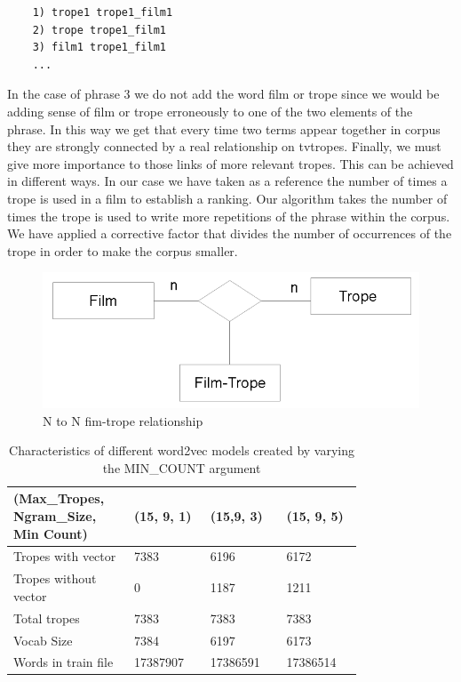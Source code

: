 \documentclass[letterpaper]{article}
\begin{document}
		\begin{verbatim}
	1) trope1 trope1_film1
	2) trope trope1_film1
	3) film1 trope1_film1
	...		
	\end{verbatim}
	
	In the case of phrase 3 we do not add the word film or trope since we would be adding sense of film or trope erroneously to one of the two elements of the phrase.
	In this way we get that every time two terms appear together in corpus they are strongly connected by a real relationship on tvtropes. Finally, we must give more importance to those links of more relevant tropes. This can be achieved in different ways. In our case we have taken as a reference the number of times a trope is used in a film to establish a ranking. Our algorithm takes the number of times the trope is used to write more repetitions of the phrase within the corpus. We have applied a corrective factor that divides the number of occurrences of the trope in order to make the corpus smaller.
	
		\begin{figure}
		\centering
		\includegraphics[width=1\linewidth]{../images/trope-film-n-to-n.png}
		\caption{N to N fim-trope relationship}
		\label{fig:film-trope-relationship}
	\end{figure}
	
	

	\begin{table}[t]
		\centering
		\begin{tabular}{|p{0.24\linewidth}|p{0.18\linewidth}|p{0.18\linewidth}|p{0.18\linewidth}|}
			\hline
			\textbf{(Max\_Tropes, Ngram\_Size, Min Count)}& \textbf{(15, 9, 1)} & \textbf{(15,9, 3)} & \textbf{(15, 9, 5)}\\
			\hline
			\hline
			Tropes with vector&7383  & 6196 & 6172 \\
			\hline
			Tropes without vector& 0 & 1187 & 1211 \\
			\hline
			Total tropes&7383&7383&7383\\
			\hline
		    Vocab Size& 7384 & 6197 & 6173 \\
			\hline
			Words in train file& 17387907 & 17386591 & 17386514 \\
			\hline 
			
		\end{tabular}
		\caption{Characteristics of different word2vec models created by varying the MIN\_COUNT argument}
		\label{tab:variations-with-min-count-argument-15-9}
	\end{table}	
	
\end{document}
